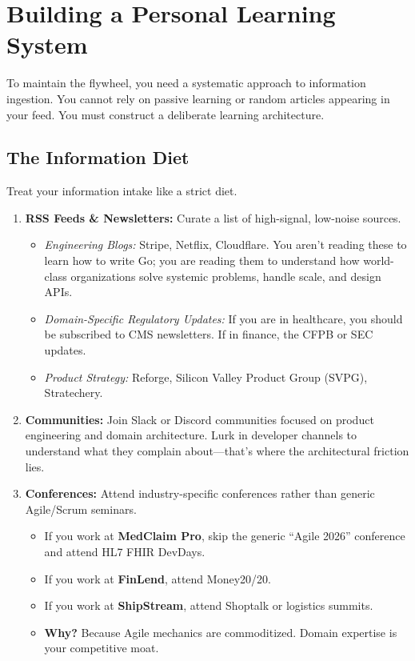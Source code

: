 \bigskip

\section{Building a Personal Learning
System}\label{building-a-personal-learning-system}

To maintain the flywheel, you need a systematic approach to information
ingestion. You cannot rely on passive learning or random articles
appearing in your feed. You must construct a deliberate learning
architecture.

\subsection{The Information Diet}\label{the-information-diet}

Treat your information intake like a strict diet.

\begin{enumerate}
\def\labelenumi{\arabic{enumi}.}
\tightlist
\item
  \textbf{RSS Feeds \& Newsletters:} Curate a list of high-signal,
  low-noise sources.

  \begin{itemize}
  \tightlist
  \item
    \emph{Engineering Blogs:} Stripe, Netflix, Cloudflare. You aren't
    reading these to learn how to write Go; you are reading them to
    understand how world-class organizations solve systemic problems,
    handle scale, and design APIs.
  \item
    \emph{Domain-Specific Regulatory Updates:} If you are in healthcare,
    you should be subscribed to CMS newsletters. If in finance, the CFPB
    or SEC updates.
  \item
    \emph{Product Strategy:} Reforge, Silicon Valley Product Group
    (SVPG), Stratechery.
  \end{itemize}
\item
  \textbf{Communities:} Join Slack or Discord communities focused on
  product engineering and domain architecture. Lurk in developer
  channels to understand what they complain about---that's where the
  architectural friction lies.
\item
  \textbf{Conferences:} Attend industry-specific conferences rather than
  generic Agile/Scrum seminars.

  \begin{itemize}
  \tightlist
  \item
    If you work at \textbf{MedClaim Pro}, skip the generic ``Agile
    2026'' conference and attend HL7 FHIR DevDays.
  \item
    If you work at \textbf{FinLend}, attend Money20/20.
  \item
    If you work at \textbf{ShipStream}, attend Shoptalk or logistics
    summits.
  \item
    \textbf{Why?} Because Agile mechanics are commoditized. Domain
    expertise is your competitive moat.
  \end{itemize}
\end{enumerate}

